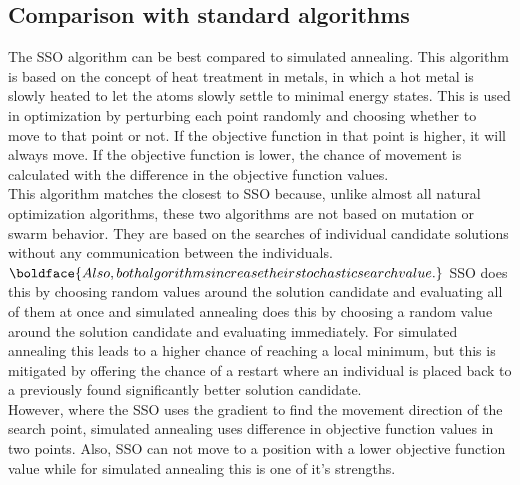 \documentclass[runningheads]{llncs}
\begin{document}
\subsection{Comparison with standard algorithms}
The SSO algorithm can be best compared to simulated annealing. This algorithm is based on the concept of heat treatment in metals, in which a hot metal is slowly heated to let the atoms slowly settle to minimal energy states. This is used in optimization by perturbing each point randomly and choosing whether to move to that point or not. If the objective function in that point is higher, it will always move. If the objective function is lower, the chance of movement is calculated with the difference in the objective function values.\\
This algorithm matches the closest to SSO because, unlike almost all natural optimization algorithms, these two algorithms are not based on mutation or swarm behavior. They are based on the searches of individual candidate solutions without any communication between the individuals. $\boldface{Also, both algorithms increase their stochastic search value.}$ SSO does this by choosing random values around the solution candidate and evaluating all of them at once and simulated annealing does this by choosing a random value around the solution candidate and evaluating immediately. For simulated annealing this leads to a higher chance of reaching a local minimum, but this is mitigated by offering the chance of a restart where an individual is placed back to a previously found significantly better solution candidate.\\
However, where the SSO uses the gradient to find the movement direction of the search point, simulated annealing uses difference in objective function values in two points. Also, SSO can not move to a position with a lower objective function value while for simulated annealing this is one of it's strengths.\\

\end{document}
